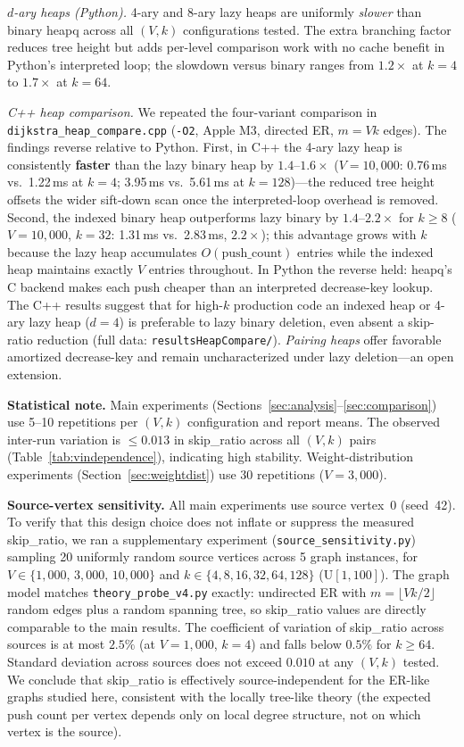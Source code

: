 \documentclass[conference]{IEEEtran}
\begin{document}
\textit{$d$-ary heaps (Python).}
4-ary and 8-ary lazy heaps are uniformly \emph{slower} than binary heapq
across all $(V,k)$ configurations tested.  The extra branching factor
reduces tree height but adds per-level comparison work with no cache
benefit in Python's interpreted loop; the slowdown versus binary ranges
from $1.2\times$ at $k=4$ to $1.7\times$ at $k=64$.

\textit{C++ heap comparison.}
We repeated the four-variant comparison in \texttt{dijkstra\_heap\_compare.cpp}
(\texttt{-O2}, Apple M3, directed ER, $m=Vk$ edges).
The findings reverse relative to Python.
First, in C++ the 4-ary lazy heap is consistently \textbf{faster} than
the lazy binary heap by $1.4$--$1.6\times$ ($V=10{,}000$: 0.76\,ms
vs.\ 1.22\,ms at $k=4$; 3.95\,ms vs.\ 5.61\,ms at $k=128$)---the
reduced tree height offsets the wider sift-down scan once the
interpreted-loop overhead is removed.
Second, the indexed binary heap outperforms lazy binary by
$1.4$--$2.2\times$ for $k\geq 8$ ($V=10{,}000$, $k=32$: 1.31\,ms
vs.\ 2.83\,ms, $2.2\times$); this advantage grows with $k$ because
the lazy heap accumulates $O(\text{push\_count})$ entries while the
indexed heap maintains exactly $V$ entries throughout.
In Python the reverse held: heapq's C backend makes each push cheaper
than an interpreted decrease-key lookup.
The C++ results suggest that for high-$k$ production code an indexed
heap or 4-ary lazy heap ($d=4$) is preferable to lazy binary deletion,
even absent a skip-ratio reduction (full data: \texttt{resultsHeapCompare/}).
\emph{Pairing heaps} offer favorable amortized decrease-key and remain
uncharacterized under lazy deletion---an open extension.

\noindent\textbf{Statistical note.}
Main experiments (Sections~\ref{sec:analysis}--\ref{sec:comparison}) use
5--10 repetitions per $(V,k)$ configuration and report means.
The observed inter-run variation is $\leq 0.013$ in skip\_ratio across
all $(V,k)$ pairs (Table~\ref{tab:vindependence}), indicating high stability.
Weight-distribution experiments (Section~\ref{sec:weightdist}) use
30 repetitions ($V=3{,}000$).

\noindent\textbf{Source-vertex sensitivity.}
All main experiments use source vertex~0 (seed~42).  To verify that this
design choice does not inflate or suppress the measured skip\_ratio, we
ran a supplementary experiment (\texttt{source\_sensitivity.py}) sampling
20 uniformly random source vertices across 5 graph instances, for
$V\in\{1{,}000,\,3{,}000,\,10{,}000\}$ and $k\in\{4,8,16,32,64,128\}$
($\mathrm{U}[1,100]$).  The graph model matches \texttt{theory\_probe\_v4.py}
exactly: undirected ER with $m=\lfloor Vk/2\rfloor$ random edges plus a
random spanning tree, so skip\_ratio values are directly comparable to the
main results.
The coefficient of variation of skip\_ratio across sources is at most
$2.5\%$ (at $V=1{,}000$, $k=4$) and falls below $0.5\%$ for $k\geq 64$.
Standard deviation across sources does not exceed $0.010$ at any $(V,k)$
tested.  We conclude that skip\_ratio is effectively source-independent for
the ER-like graphs studied here, consistent with the locally tree-like
theory (the expected push count per vertex depends only on local degree
structure, not on which vertex is the source).
\end{document}
